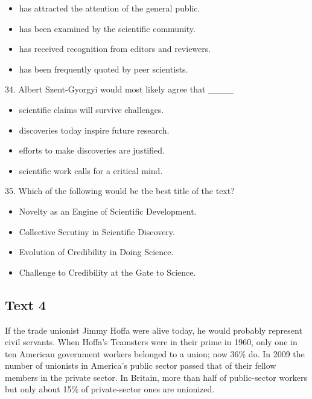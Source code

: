 \documentclass[UTF8,11pt]{ctexart}
\begin{document}
\begin{itemize}[leftmargin=2em,itemsep=.2em,topsep=.4em]\item[A.] has attracted the attention of the general public.
\item[B.] has been examined by the scientific community.
\item[C.] has received recognition from editors and reviewers.
\item[D.] has been frequently quoted by peer scientists.
\end{itemize}

34. Albert Szent-Gyorgyi would most likely agree that \_\_\_\_


\begin{itemize}[leftmargin=2em,itemsep=.2em,topsep=.4em]\item[A.] scientific claims will survive challenges.
\item[B.] discoveries today inspire future research.
\item[C.] efforts to make discoveries are justified.
\item[D.] scientific work calls for a critical mind.
\end{itemize}

35. Which of the following would be the best title of the text?


\begin{itemize}[leftmargin=2em,itemsep=.2em,topsep=.4em]\item[A.] Novelty as an Engine of Scientific Development.
\item[B.] Collective Scrutiny in Scientific Discovery.
\item[C.] Evolution of Credibility in Doing Science.
\item[D.] Challenge to Credibility at the Gate to Science.
\end{itemize}

\subsection*{\textbf{Text 4}}


If the trade unionist Jimmy Hoffa were alive today, he would probably represent civil servants. When Hoffa’s Teamsters were in their prime in 1960, only one in ten American government workers belonged to a union; now 36\% do. In 2009 the number of unionists in America’s public sector passed that of their fellow members in the private sector. In Britain, more than half of public-sector workers but only about 15\% of private-sector ones are unionized.
\end{document}
